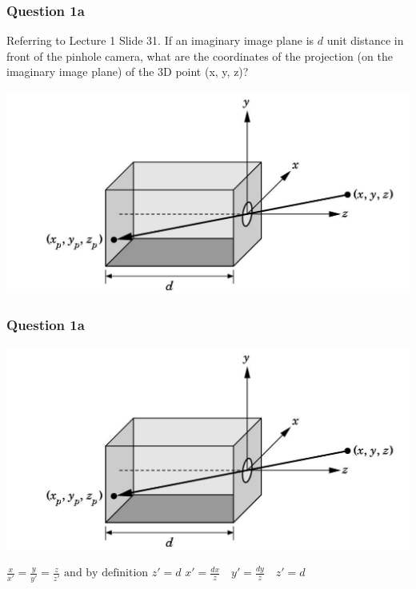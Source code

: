 \documentclass{beamer}
\begin{document}
\begin{frame}
    \frametitle{Question 1a}
    Referring to Lecture 1 Slide 31. If an imaginary image plane is $d$ unit distance in front of the pinhole camera, 
    what are the coordinates of the projection (on the imaginary image plane) of the 3D point (x, y, z)? 

    \vspace{1em}

    \begin{center}
        \includegraphics[scale=0.5]{q1-pinhole.png}
    \end{center}
\end{frame}

\begin{frame}
    \frametitle{Question 1a}

    \begin{center}
        \includegraphics[scale=0.5]{q1-pinhole.png}
    \end{center}
    
    \vspace{1em}

    \begin{tcolorbox}
        \centering
        $\frac{x}{x'} = \frac{y}{y'} = \frac{z}{z'} \text{ and by definition } z' = d$
        $ x' = \frac{dx}{z} \quad y' = \frac{dy}{z} \quad z' = d$
    \end{tcolorbox}

\end{frame}
\end{document}
